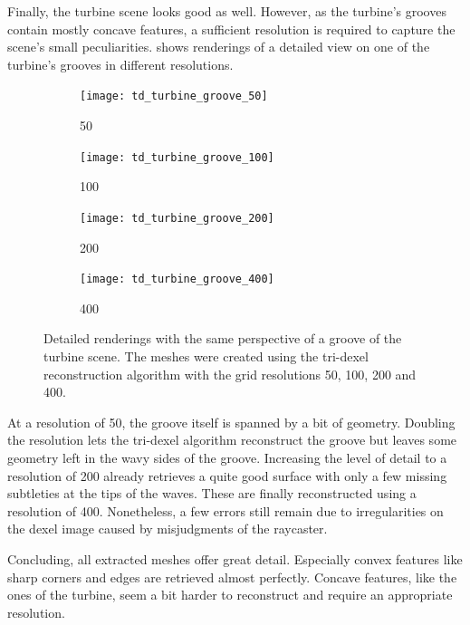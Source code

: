 Finally, the turbine scene looks good as well.
However, as the turbine's grooves contain mostly concave features, a sufficient resolution is required to capture the scene's small peculiarities.
 shows renderings of a detailed view on one of the turbine's grooves in different resolutions.
%
\begin{figure}
	\centering
	\begin{subfigure}[b]{0.24\textwidth}
		\centering
		\texttt{[image: td\_turbine\_groove\_50]}
		\caption{50}
		\label{fig:td_turbine_groove_50}
	\end{subfigure}
	\begin{subfigure}[b]{0.24\textwidth}
		\centering
		\texttt{[image: td\_turbine\_groove\_100]}
		\caption{100}
		\label{fig:td_turbine_groove_100}
	\end{subfigure}
	\begin{subfigure}[b]{0.24\textwidth}
		\centering
		\texttt{[image: td\_turbine\_groove\_200]}
		\caption{200}
		\label{fig:td_turbine_groove_200}
	\end{subfigure}
	\begin{subfigure}[b]{0.24\textwidth}
		\centering
		\texttt{[image: td\_turbine\_groove\_400]}
		\caption{400}
		\label{fig:td_turbine_groove_400}
	\end{subfigure}
	\caption{
		Detailed renderings with the same perspective of a groove of the turbine scene.
		The meshes were created using the tri-dexel reconstruction algorithm with the grid resolutions 50, 100, 200 and 400.
	}
	\label{fig:td_grooves}
\end{figure}
%
At a resolution of 50, the groove itself is spanned by a bit of geometry.
Doubling the resolution lets the tri-dexel algorithm reconstruct the groove but leaves some geometry left in the wavy sides of the groove.
Increasing the level of detail to a resolution of 200 already retrieves a quite good surface with only a few missing subtleties at the tips of the waves.
These are finally reconstructed using a resolution of 400.
Nonetheless, a few errors still remain due to irregularities on the dexel image caused by misjudgments of the raycaster.

Concluding, all extracted meshes offer great detail.
Especially convex features like sharp corners and edges are retrieved almost perfectly.
Concave features, like the ones of the turbine, seem a bit harder to reconstruct and require an appropriate resolution.

